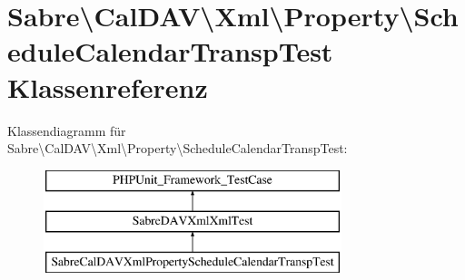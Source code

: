 \hypertarget{class_sabre_1_1_cal_d_a_v_1_1_xml_1_1_property_1_1_schedule_calendar_transp_test}{}\section{Sabre\textbackslash{}Cal\+D\+AV\textbackslash{}Xml\textbackslash{}Property\textbackslash{}Schedule\+Calendar\+Transp\+Test Klassenreferenz}
\label{class_sabre_1_1_cal_d_a_v_1_1_xml_1_1_property_1_1_schedule_calendar_transp_test}
Klassendiagramm für Sabre\textbackslash{}Cal\+D\+AV\textbackslash{}Xml\textbackslash{}Property\textbackslash{}Schedule\+Calendar\+Transp\+Test\+:\begin{figure}[H]
\begin{center}
\leavevmode
\includegraphics[height=3.000000cm]{class_sabre_1_1_cal_d_a_v_1_1_xml_1_1_property_1_1_schedule_calendar_transp_test}
\end{center}
\end{figure}
